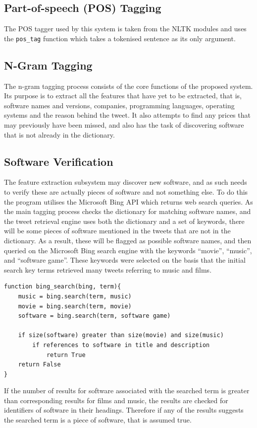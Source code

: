\subsection{Part-of-speech (POS) Tagging}
The POS tagger used by this system is taken from the NLTK modules and uses the \texttt{pos\_tag} function which takes a tokenised sentence as its only argument.

\subsection{N-Gram Tagging}
The n-gram tagging process consists of the core functions of the proposed system. Its purpose is to extract all the features that have yet to be extracted, that is, software names and versions, companies, programming languages, operating systems and the reason behind the tweet. It also attempts to find any prices that may previously have been missed, and also has the task of discovering software that is not already in the dictionary.

\subsection{Software Verification}
The feature extraction subsystem may discover new software, and as such needs to verify these are actually pieces of software and not something else. To do this the program utilises the Microsoft Bing API which returns web search queries. As the main tagging process checks the dictionary for matching software names, and the tweet retrieval engine uses both the dictionary and a set of keywords, there will be some pieces of software mentioned in the tweets that are not in the dictionary. As a result, these will be flagged as possible software names, and then queried on the Microsoft Bing search engine with the keywords ``movie'', ``music'', and ``software game''. These keywords were selected on the basis that the initial search key terms retrieved many tweets referring to music and films.
\begin{verbatim}
function bing_search(bing, term){
    music = bing.search(term, music)
    movie = bing.search(term, movie)
    software = bing.search(term, software game)

    if size(software) greater than size(movie) and size(music)
        if references to software in title and description
            return True
    return False
}
\end{verbatim}
If the number of results for software associated with the searched term is greater than corresponding results for films and music, the results are checked for identifiers of software in their headings. Therefore if any of the results suggests the searched term is a piece of software, that is assumed true.

